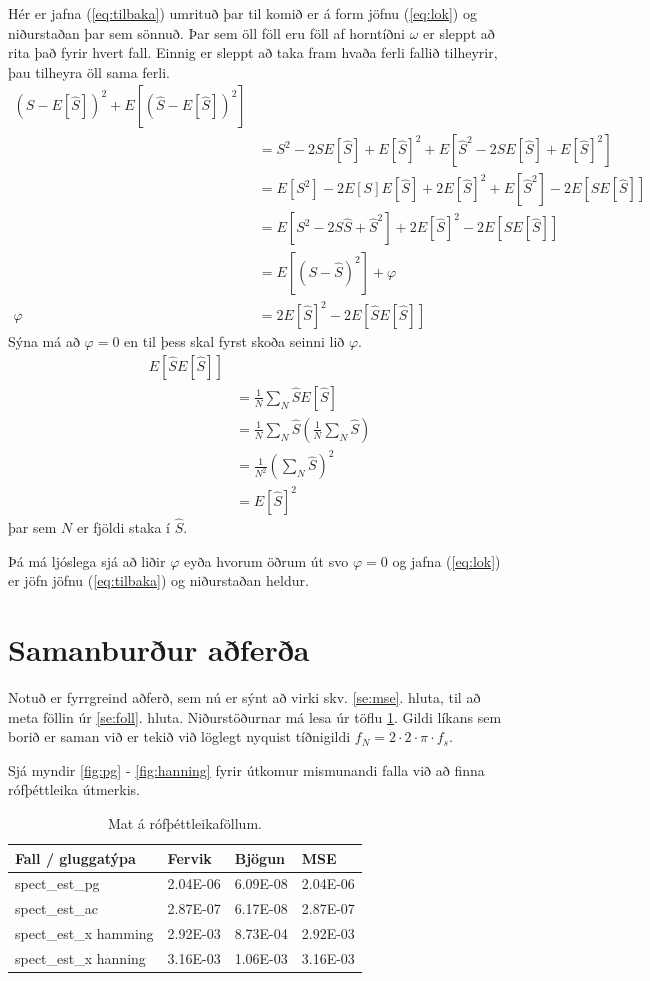 \documentclass[11pt,a4paper]{article}
\begin{document}
Hér er jafna (\ref{eq:tilbaka}) umrituð þar til komið er á form
jöfnu (\ref{eq:lok}) og niðurstaðan þar sem sönnuð. Þar sem öll föll eru 
föll af horntíðni $\omega$ er sleppt að rita það fyrir hvert fall.
Einnig er sleppt að taka fram hvaða ferli fallið tilheyrir, þau 
tilheyra öll sama ferli.
\begin{align*}
    (S-E[\hat{S}])^2 + E[(\hat{S}-E[\hat{S}])^2] \\
    &= S^2 - 2SE[\hat{S}]+E[\hat{S}]^2
    + E[\hat{S}^2-2\hat{S}E[\hat{S}]+E[\hat{S}]^{2}] \\
    &= E[S^2]-2E[S]E[\hat{S}] +2E[\hat{S}]^2 
    +E[\hat{S}^2]-2E[\hat{S}E[\hat{S}]] \\
    &= E[S^2-2S\hat{S}+\hat{S}^2]+2E[\hat{S}]^2-2E[\hat{S}E[\hat{S}]] \\
    &= E[(S-\hat{S})^2] + \varphi \\
    \varphi &= 2E[\hat{S}]^2-2E[\hat{S}E[\hat{S}]]
\end{align*}
Sýna má að $\varphi=0$ en til þess skal fyrst skoða seinni lið $\varphi$.
\begin{align*}
    E[\hat{S}E[\hat{S}]] \\
    &= \frac{1}{N}\sum_N \hat{S} E[\hat{S}] \\
    &= \frac{1}{N}\sum_N \hat{S} 
    \left(\frac{1}{N} \sum_N \hat{S}\right) \\
    &= \frac{1}{N^2}\left(\sum_N \hat{S} \right) ^{2} \\
    &= E[\hat{S}]^2
\end{align*}
þar sem $N$ er fjöldi staka í $\hat{S}$.

Þá má ljóslega sjá að liðir $\varphi$ eyða hvorum öðrum út svo 
$\varphi=0$ og jafna (\ref{eq:lok}) er jöfn jöfnu (\ref{eq:tilbaka})
og niðurstaðan heldur.
\section{Samanburður aðferða}
Notuð er fyrrgreind aðferð, sem nú er sýnt að virki skv. \ref{se:mse}.
hluta, til að meta föllin úr \ref{se:foll}. hluta. Niðurstöðurnar
má lesa úr töflu \ref{tab:tafla}. Gildi líkans sem borið er saman við
er tekið við löglegt nyquist tíðnigildi
$f_N = 2\cdot2\cdot\pi\cdot f_s$.

Sjá myndir \ref{fig:pg} - \ref{fig:hanning} fyrir útkomur mismunandi
falla við að finna rófþéttleika útmerkis.
\begin{table}[htbp]
    \centering
    \begin{tabular}{l | l | l | l}
        Fall / gluggatýpa & Fervik & Bjögun & MSE \\ \hline
        spect\_est\_pg    & 2.04E-06 & 6.09E-08 & 2.04E-06 \\
        spect\_est\_ac    & 2.87E-07 & 6.17E-08 & 2.87E-07 \\
        spect\_est\_x hamming & 2.92E-03 & 8.73E-04 & 2.92E-03 \\
        spect\_est\_x hanning & 3.16E-03 & 1.06E-03 & 3.16E-03 \\
    \end{tabular}
    \caption{Mat á rófþéttleikaföllum.}
    \label{tab:tafla}
\end{table}
\end{document}
